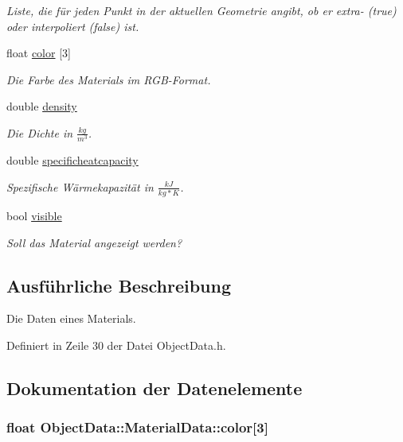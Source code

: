 \begin{DoxyCompactItemize}
\begin{DoxyCompactList}\small\item\em Liste, die für jeden Punkt in der aktuellen Geometrie angibt, ob er extra-\/ (true) oder interpoliert (false) ist. \end{DoxyCompactList}\item 
float \hyperlink{structObjectData_1_1MaterialData_a3930f8e673d50b88c9234c7f73c16a91}{color} \mbox{[}3\mbox{]}
\begin{DoxyCompactList}\small\item\em Die Farbe des Materials im R\-G\-B-\/\-Format. \end{DoxyCompactList}\item 
double \hyperlink{structObjectData_1_1MaterialData_a49cbca11f42993f41497e725fe8ca68c}{density}
\begin{DoxyCompactList}\small\item\em Die Dichte in $\frac{kg}{m^3}$. \end{DoxyCompactList}\item 
double \hyperlink{structObjectData_1_1MaterialData_a784e2b70f98d146979fd422d41445fea}{specificheatcapacity}
\begin{DoxyCompactList}\small\item\em Spezifische Wärmekapazität in $\frac{kJ}{kg*K}$. \end{DoxyCompactList}\item 
bool \hyperlink{structObjectData_1_1MaterialData_a37980da11f6b51b30eb41c3ab4e9674a}{visible}
\begin{DoxyCompactList}\small\item\em Soll das Material angezeigt werden? \end{DoxyCompactList}\end{DoxyCompactItemize}


\subsection{Ausführliche Beschreibung}
Die Daten eines Materials. 

Definiert in Zeile 30 der Datei Object\-Data.\-h.



\subsection{Dokumentation der Datenelemente}
\hypertarget{structObjectData_1_1MaterialData_a3930f8e673d50b88c9234c7f73c16a91}{
\subsubsection[{color}]{\setlength{\rightskip}{0pt plus 5cm}float Object\-Data\-::\-Material\-Data\-::color\mbox{[}3\mbox{]}}}\label{structObjectData_1_1MaterialData_a3930f8e673d50b88c9234c7f73c16a91}


